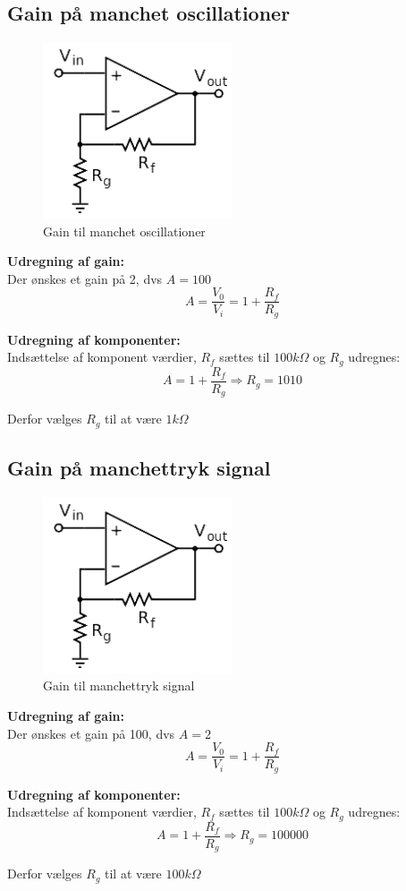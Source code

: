\subsection{Gain på manchet oscillationer }
\begin{figure}[H]
	\centering
	\includegraphics[width = 0.5\textwidth]{billeder/OpAMP_gain.png}
	\caption{Gain til manchet oscillationer}\label{fig:opam1}
\end{figure}
\textbf{Udregning af gain: } \\
Der ønskes et gain på 2, dvs $A = 100$
\begin{equation}
	A = \frac{V_0}{V_i} = 1 + \frac{R_f}{R_g}
\end{equation}


\textbf{Udregning af komponenter:}\\
Indsættelse af komponent værdier, $R_f$ sættes til $100k\Omega$ og $R_g$ udregnes: 
\begin{equation}
	 A = 1 + \frac{R_f}{R_g} \Rightarrow R_g =  1010
\end{equation}

Derfor vælges $R_g$ til at være $1k\Omega$

\subsection{Gain på manchettryk signal }
\begin{figure}[H]
	\centering
	\includegraphics[width = 0.5\textwidth]{billeder/OpAMP_gain.png}
	\caption{Gain til manchettryk signal}\label{fig:opam2}
\end{figure}
\textbf{Udregning af gain: } \\
Der ønskes et gain på 100, dvs $A = 2$
\begin{equation}
	A = \frac{V_0}{V_i} = 1 + \frac{R_f}{R_g}
\end{equation}

\textbf{Udregning af komponenter:}\\
Indsættelse af komponent værdier, $R_f$ sættes til $100k\Omega$ og $R_g$ udregnes:
\begin{equation}
	 A = 1 + \frac{R_f}{R_g} \Rightarrow R_g = 100000
\end{equation}

Derfor vælges $R_g$ til at være $100k\Omega$